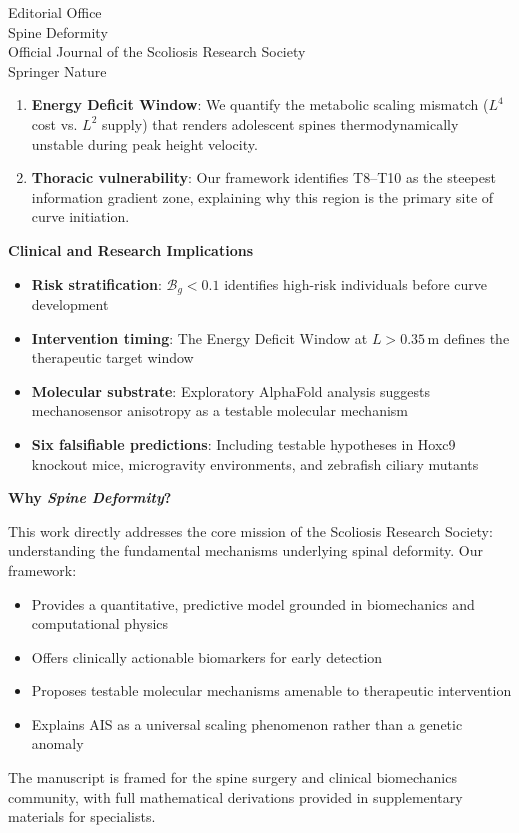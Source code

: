 \documentclass[11pt,a4paper]{letter}
\begin{document}
\begin{letter}{Editorial Office\\
Spine Deformity\\
Official Journal of the Scoliosis Research Society\\
Springer Nature}
\begin{enumerate}
\item \textbf{Energy Deficit Window}: We quantify the metabolic scaling mismatch ($L^4$ cost vs. $L^2$ supply) that renders adolescent spines thermodynamically unstable during peak height velocity.

\item \textbf{Thoracic vulnerability}: Our framework identifies T8--T10 as the steepest information gradient zone, explaining why this region is the primary site of curve initiation.
\end{enumerate}

\textbf{Clinical and Research Implications}

\begin{itemize}
\item \textbf{Risk stratification}: $\mathcal{B}_g < 0.1$ identifies high-risk individuals before curve development
\item \textbf{Intervention timing}: The Energy Deficit Window at $L > 0.35$\,m defines the therapeutic target window
\item \textbf{Molecular substrate}: Exploratory AlphaFold analysis suggests mechanosensor anisotropy as a testable molecular mechanism
\item \textbf{Six falsifiable predictions}: Including testable hypotheses in Hoxc9 knockout mice, microgravity environments, and zebrafish ciliary mutants
\end{itemize}

\textbf{Why \textit{Spine Deformity}?}

This work directly addresses the core mission of the Scoliosis Research Society: understanding the fundamental mechanisms underlying spinal deformity. Our framework:

\begin{itemize}
\item Provides a quantitative, predictive model grounded in biomechanics and computational physics
\item Offers clinically actionable biomarkers for early detection
\item Proposes testable molecular mechanisms amenable to therapeutic intervention
\item Explains AIS as a universal scaling phenomenon rather than a genetic anomaly
\end{itemize}

The manuscript is framed for the spine surgery and clinical biomechanics community, with full mathematical derivations provided in supplementary materials for specialists.


\end{letter}
\end{document}
